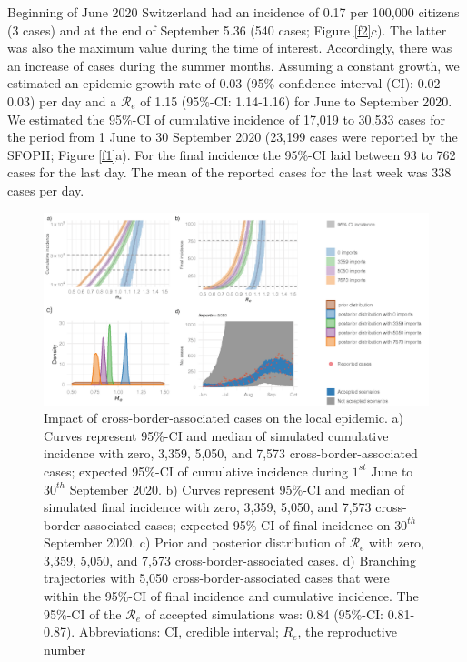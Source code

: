 \documentclass[10pt, a4paper, twoside]{article}
\begin{document}
\begin{multicols}{2}
Beginning of June 2020 Switzerland had an incidence of 0.17 per 100,000 citizens (3 cases) and at the end of September 5.36 (540 cases; Figure \ref{f2}c).
The latter was also the maximum value during the time of interest.
Accordingly, there was an increase of cases during the summer months.
Assuming a constant growth, we estimated an epidemic growth rate of 0.03 (95\%-confidence interval (CI): 0.02-0.03) per day and a $\mathcal{R}_e$ of 1.15 (95\%-CI: 1.14-1.16) for June to September 2020.
We estimated the 95\%-CI of cumulative incidence of 17,019 to 30,533 cases for the period from 1 June to 30 September 2020 (23,199 cases were reported by the SFOPH; Figure \ref{f1}a).
For the final incidence the 95\%-CI laid between 93 to 762 cases for the last day.
The mean of the reported cases for the last week was 338 cases per day.

\begin{figure}
\centering
\includegraphics[scale=0.6]{Figure2_2021-05-26.png}
\caption{Impact of cross-border-associated cases on the local epidemic.
a) Curves represent 95\%-CI and median of simulated cumulative incidence with zero, 3,359, 5,050, and 7,573 cross-border-associated cases; expected 95\%-CI of cumulative incidence during $1^{st}$ June to $30^{th}$ September 2020.
b) Curves represent 95\%-CI and median of simulated final incidence with zero, 3,359, 5,050, and 7,573 cross-border-associated cases; expected 95\%-CI of final incidence on $30^{th}$ September 2020.
c) Prior and posterior distribution of $\mathcal{R}_e$ with zero, 3,359, 5,050, and 7,573 cross-border-associated cases.
d) Branching trajectories with 5,050 cross-border-associated cases that were within the 95\%-CI of final incidence and cumulative incidence.
The 95\%-CI of the $\mathcal{R}_e$ of accepted simulations was: 0.84 (95\%-CI: 0.81-0.87).
Abbreviations: CI, credible interval; $R_e$, the reproductive number}


\end{figure}
\end{multicols}
\end{document}
